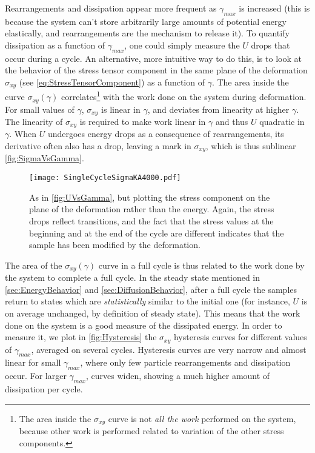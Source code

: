 Rearrangements and dissipation appear more frequent as $\gamma_{max}$ is increased (this is because the system can't store arbitrarily large amounts of potential energy elastically, and rearrangements are the mechanism to release it). To quantify dissipation as a function of $\gamma_{max}$, one could simply measure the $U$ drops that occur during a cycle. An alternative, more intuitive way to do this, is to look at the behavior of the stress tensor component in the same plane of the deformation $\sigma_{xy}$ (see \autoref{eq:StressTensorComponent}) as a function of $\gamma$. The area inside the curve $\sigma_{xy}(\gamma)$ correlates\footnote{The area inside the $\sigma_{xy}$ curve is not \emph{all the work} performed on the system, because other work is performed related to variation of the other stress components.} with the work done on the system during deformation. For small values of $\gamma$, $\sigma_{xy}$ is linear in $\gamma$, and deviates from linearity at higher $\gamma$. The linearity of $\sigma_{xy}$ is required to make work linear in $\gamma$ and thus $U$ quadratic in $\gamma$. When $U$ undergoes energy drops as a consequence of rearrangements, its derivative often also has a drop, leaving a mark in $\sigma_{xy}$, which is thus sublinear \autoref{fig:SigmaVsGamma}.

\begin{figure}[!h] 
\centering 
\texttt{[image: SingleCycleSigmaKA4000.pdf]} 
\caption{As in \autoref{fig:UVsGamma}, but plotting the stress component on the plane of the deformation rather than the energy. Again, the stress drops reflect transitions, and the fact that the stress values at the beginning and at the end of the cycle are different indicates that the sample has been modified by the deformation. \label{fig:SigmaVsGamma}}
\end{figure}

The area of the $\sigma_{xy}(\gamma)$ curve in a full cycle is thus related to the work done by the system to complete a full cycle. In the steady state mentioned in \autoref{sec:EnergyBehavior} and \autoref{sec:DiffusionBehavior}, after a full cycle the samples return to states which are \emph{statistically} similar to the initial one (for instance, $U$ is on average unchanged, by definition of steady state). This means that the work done on the system is a good measure of the dissipated energy. 
In order to measure it, we plot in \autoref{fig:Hysteresis} the $\sigma_{xy}$ hysteresis curves for different values of $\gamma_{max}$, averaged on several cycles. Hysteresis curves are very narrow and almost linear for small $\gamma_{max}$, where only few particle rearrangements and dissipation occur. For larger $\gamma_{max}$, curves widen, showing a much higher amount of dissipation per cycle.

